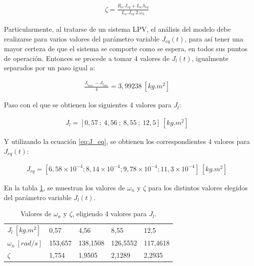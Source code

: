 \documentclass{article}
\begin{document}
\begin{sloppypar}
\begin{align} \label{eq:Factor de Amortiguamiento}
    \zeta=\frac{R_a.J_{eq}+L_a.b_{eq}}{L_a.J_{eq}\text{.2}.\omega_n}
\end{align}

Particularmente, al tratarse de un sistema LPV, el análisis del modelo debe realizarse para varios valores del parámetro variable $J_{eq}(t)$, para así tener una mayor certeza de que el sistema se comporte como se espera, en todos sus puntos de operación. Entonces se procede a tomar 4 valores de $J_l(t)$, igualmente separados por un paso igual a:

\begin{align} \label{eq:Paso para la selección de los valores del parámetro variable J_l(t)}
    \frac{J_{l_{\text{máx.}}}-J_{l_{\text{mín.}}}}{4}=3,99238 ~[kg.m^2]
\end{align}

Paso con el que se obtienen los siguientes 4 valores para $J_l$:

\begin{align} \label{eq:Valores elegidos de Jl}
    J_l=\left[0,57\ ;\ 4,56\ ;\ 8,55\ ;\ 12,5\right] ~[kg.m^2]
\end{align}

Y utilizando la ecuación \ref{eq:J_eq}, se obtienen los correspondientes 4 valores para $J_{eq}(t)$:

\begin{align} \label{eq:Valores correspondientes de Jeq}
    J_{eq}=\left[6,58\times{10}^{-4};8,14\times{10}^{-4};9,78\times{10}^{-4};11,3\times{10}^{-4}\right] ~[kg.m^2]
\end{align}

En la tabla \ref{table:Valores de omega_n y zeta, eligiendo 4 valores para Jl}, se muestran los valores de $\omega_n$ y $\zeta$ para los distintos valores elegidos del parámetro variable $J_l(t)$.

\begin{table}[H]
    \centering
    \begin{tabular}{|l|llll|}
    \cline{1-5}
    \textbf{$J_l ~[kg.m^2]$}     &   0,57  &   4,56   &   8,55   &  12,5    \\ \cline{1-5}
    \textbf{$\omega_n ~[rad/s]$} & 153,657 & 138,1508 & 126,5552 & 117,4618 \\ \cline{1-5}
    \textbf{$\zeta$}             &   1,754 &   1,9505 &   2,1289 &   2,2935 \\ \cline{1-5}
    \end{tabular}
    \caption{\label{table:Valores de omega_n y zeta, eligiendo 4 valores para Jl}Valores de $\omega_n$ y $\zeta$, eligiendo 4 valores para $J_l$.}
\end{table}


\end{sloppypar}
\end{document}
